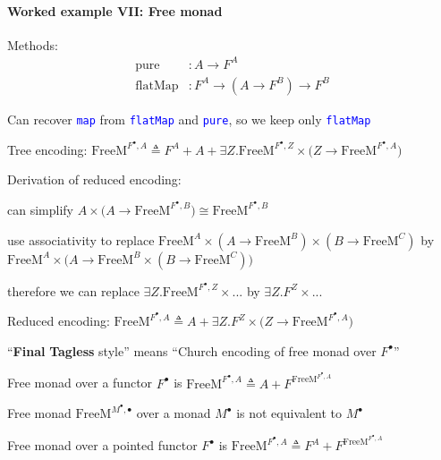 \paragraph{Worked example VII: Free monad}

Methods:
\begin{align*}
\text{pure} & :A\rightarrow F^{A}\\
\text{flatMap} & :F^{A}\rightarrow(A\rightarrow F^{B})\rightarrow F^{B}
\end{align*}

Can recover \texttt{\textcolor{blue}{\footnotesize{}map}} from \texttt{\textcolor{blue}{\footnotesize{}flatMap}}
and \texttt{\textcolor{blue}{\footnotesize{}pure}}, so we keep only
\texttt{\textcolor{blue}{\footnotesize{}flatMap}} 

Tree encoding: {\footnotesize{}$\text{FreeM}^{F^{\bullet},A}\triangleq F^{A}+A+\exists Z.\text{FreeM}^{F^{\bullet},Z}\times\big(Z\rightarrow\text{FreeM}^{F^{\bullet},A}\big)$}{\footnotesize\par}

Derivation of reduced encoding: 

can simplify $A\times\big(A\rightarrow\text{FreeM}^{F^{\bullet},B}\big)\cong\text{FreeM}^{F^{\bullet},B}$

use associativity to replace $\text{FreeM}^{A}\times(A\rightarrow\text{FreeM}^{B})\times(B\rightarrow\text{FreeM}^{C})$
by $\text{FreeM}^{A}\times\big(A\rightarrow\text{FreeM}^{B}\times(B\rightarrow\text{FreeM}^{C})\big)$

therefore we can replace $\exists Z.\text{FreeM}^{F^{\bullet},Z}\times...$
by $\exists Z.F^{Z}\times...$

Reduced encoding: $\text{FreeM}^{F^{\bullet},A}\triangleq A+\exists Z.F^{Z}\times\big(Z\rightarrow\text{FreeM}^{F^{\bullet},A}\big)$

\textsf{``}\textbf{Final} \textbf{Tagless} style\textsf{''} means \textsf{``}Church encoding
of free monad over $F^{\bullet}$\textsf{''}

Free monad over a functor $F^{\bullet}$ is $\text{FreeM}^{F^{\bullet},A}\triangleq A+F^{\text{FreeM}^{F^{\bullet},A}}$

Free monad $\text{FreeM}^{M^{\bullet},\bullet}$ over a monad $M^{\bullet}$
is not equivalent to $M^{\bullet}$

Free monad over a pointed functor $F^{\bullet}$ is {\footnotesize{}$\text{FreeM}^{F^{\bullet},A}\triangleq F^{A}+F^{\text{FreeM}^{F^{\bullet},A}}$}{\footnotesize\par}


